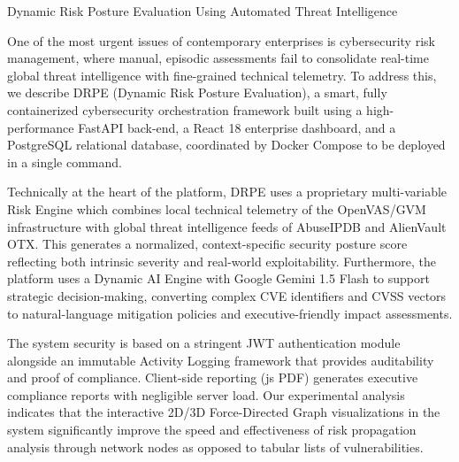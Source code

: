 \documentclass[a4paper]{article}
\begin{document}
\Large
 \begin{center}  
 Dynamic Risk Posture Evaluation Using Automated Threat Intelligence
\vspace{2em}

\large


\end{center}


\normalsize

One of the most urgent issues of contemporary enterprises is cybersecurity risk management, where manual, episodic assessments fail to consolidate real-time global threat intelligence with fine-grained technical telemetry. To address this, we describe DRPE (Dynamic Risk Posture Evaluation), a smart, fully containerized cybersecurity orchestration framework built using a high-performance FastAPI back-end, a React 18 enterprise dashboard, and a PostgreSQL relational database, coordinated by Docker Compose to be deployed in a single command.

Technically at the heart of the platform, DRPE uses a proprietary multi-variable Risk Engine which combines local technical telemetry of the OpenVAS/GVM infrastructure with global threat intelligence feeds of AbuseIPDB and AlienVault OTX. This generates a normalized, context-specific security posture score reflecting both intrinsic severity and real-world exploitability. Furthermore, the platform uses a Dynamic AI Engine with Google Gemini 1.5 Flash to support strategic decision-making, converting complex CVE identifiers and CVSS vectors to natural-language mitigation policies and executive-friendly impact assessments.

The system security is based on a stringent JWT authentication module alongside an immutable Activity Logging framework that provides auditability and proof of compliance. Client-side reporting (js PDF) generates executive compliance reports with negligible server load. Our experimental analysis indicates that the interactive 2D/3D Force-Directed Graph visualizations in the system significantly improve the speed and effectiveness of risk propagation analysis through network nodes as opposed to tabular lists of vulnerabilities.\\


\vspace{1em}
\end{document}
